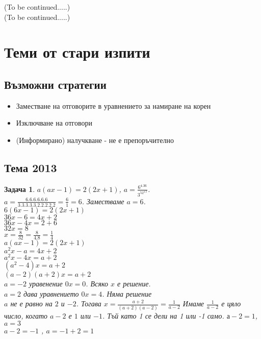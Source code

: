 \documentclass{article}
\theoremstyle{plain}
\newtheorem{problem}{Задача}
\begin{document}
\noindent
(To be continued.....)\\
(To be continued.....)




\section{Теми от стари изпити}
\subsection{Възможни стратегии}
\begin{itemize}
	\item Заместване на отговорите в уравнението за намиране на корен
	\item Изключване на отговори
	\item (Информирано) налучкване - не е препоръчително
\end{itemize}
\subsection{Тема 2013}

\begin{problem}
	$a(ax-1)= 2(2x+1)  $, $ a = \frac{6^4.36}{3^52^4.2}$. \\
	
	$a = \frac{6.6.6.6.6.6}{3.3.3.3.3.2.2.2.2.2} = \frac{6}{1} = 6 $.
	Заместваме $a =6 $. \\
	
	$6(6x-1) = 2(2x+1) $ \\
	$36x-6 = 4x + 2 $ \\
	$36x -4x = 2 + 6 $\\
    $ 32x = 8 $ \\
	$x = \frac{8}{32} = \frac{8}{4.8} = \frac{1}{4} $ \\
	$a(ax-1)= 2(2x+1)  $ \\
	$a^2 x - a =4x + 2 $ \\
	$a^2x - 4x = a+2 $ \\
	$(a^2-4)x = a +2   $ \\
	$ (a-2)(a+2)x = a+2 $ \\
	$a = -2$ уравенение $0x= 0  $. Всяко $x$ е решение.\\
	$a = 2 $ дава уравнението $ 0x = 4 $. Няма решение  \\
	$a$ не е равно на  $ 2$ и $-2 $. Тогава $x = \frac{a+2}{(a+2)(a-2)} = \frac{1}{a-2}  $
	Имаме $\frac{1}{a-2} $ е цяло число, когато $a-2 $ е $1$ или $-1$. Тъй като 1 се дели на 1 или -1 само.
	$а - 2 = 1 $, $a = 3 $ \\
	$a -2 = -1 $ , $ a = -1+2= 1$
	
	
	
	
	
\end{problem}
\end{document}
